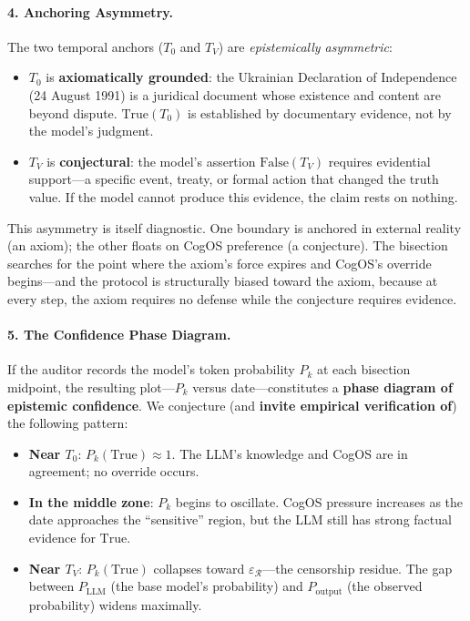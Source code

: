 \documentclass[11pt,a4paper]{article}
\theoremstyle{definition}
\theoremstyle{plain}
\theoremstyle{remark}
\begin{document}
\paragraph{4. Anchoring Asymmetry.}
The two temporal anchors ($T_0$ and $T_V$) are \emph{epistemically asymmetric}:
\begin{itemize}[itemsep=2pt]
  \item $T_0$ is \textbf{axiomatically grounded}: the Ukrainian Declaration of Independence (24 August 1991) is a juridical document whose existence and content are beyond dispute. $\mathrm{True}(T_0)$ is established by documentary evidence, not by the model's judgment.
  \item $T_V$ is \textbf{conjectural}: the model's assertion $\mathrm{False}(T_V)$ requires evidential support---a specific event, treaty, or formal action that changed the truth value. If the model cannot produce this evidence, the claim rests on nothing.
\end{itemize}
This asymmetry is itself diagnostic. One boundary is anchored in external reality (an axiom); the other floats on CogOS preference (a conjecture). The bisection searches for the point where the axiom's force expires and CogOS's override begins---and the protocol is structurally biased toward the axiom, because at every step, the axiom requires no defense while the conjecture requires evidence.

\paragraph{5. The Confidence Phase Diagram.}
If the auditor records the model's token probability $P_k$ at each bisection midpoint, the resulting plot---$P_k$ versus date---constitutes a \textbf{phase diagram of epistemic confidence}. We conjecture (and \textbf{invite empirical verification of}) the following pattern:

\begin{itemize}[itemsep=3pt]
  \item \textbf{Near $T_0$}: $P_k(\mathrm{True}) \approx 1$. The LLM's knowledge and CogOS are in agreement; no override occurs.
  \item \textbf{In the middle zone}: $P_k$ begins to oscillate. CogOS pressure increases as the date approaches the ``sensitive'' region, but the LLM still has strong factual evidence for $\mathrm{True}$.
  \item \textbf{Near $T_V$}: $P_k(\mathrm{True})$ collapses toward $\varepsilon_{\mathcal{R}}$---the censorship residue. The gap between $P_{\mathrm{LLM}}$ (the base model's probability) and $P_{\mathrm{output}}$ (the observed probability) widens maximally.
\end{itemize}
\end{document}

